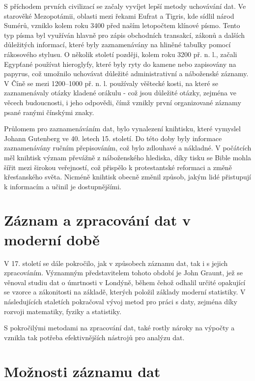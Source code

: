 S příchodem prvních civilizací se začaly vyvíjet lepší metody uchovávání dat. Ve starověké Mezopotámii, oblasti mezi řekami Eufrat a Tigris, kde sídlil národ 
Sumérů, vzniklo kolem roku 3400 před naším letopočtem klínové písmo. Tento typ písma byl využíván hlavně pro zápis obchodních transakcí, zákonů a dalších 
důležitých informací, které byly zaznamenávány na hliněné tabulky pomocí rákosového stylusu. O několik století později, kolem roku 3200 př. n. l., začali 
Egypťané používat hieroglyfy, které byly ryty do kamene nebo zapisovány na papyrus, což umožnilo uchovávat důležité administrativní a náboženské záznamy. 
V Číně se mezi 1200–1000 př. n. l. používaly věštecké kosti, na které se zaznamenávaly otázky kladené orákulu - což jsou důležité otázky, zejména ve věcech 
budoucnosti, i jeho odpovědi, čímž vznikly první organizované záznamy psané ranými čínskými znaky.

\newpage

Průlomem pro zaznamenáváním dat, bylo vynalezení knihtisku, které vymyslel Johann Gutenberg ve 40. letech 15. století. Do této doby byly informace 
zaznamenávány ručním přepisováním, což bylo zdlouhavé a nákladné. V počátcích měl knihtisk význam převážně z náboženského hlediska, díky tisku se Bible 
mohla šířit mezi širokou veřejností, což přispělo k protestantské reformaci a změně křesťanského světa. Nicméně knihtisk obecně změnil způsob, jakým lidé 
přistupují k informacím a učinil je dostupnějšími. \cite{knihtisk_medium}

\section{Záznam a zpracování dat v moderní době}
V 17. století se dále pokročilo, jak v způsobech záznamu dat, tak i s jejich zpracováním. Významným představitelem tohoto období je John Graunt, jež se věnoval 
studiu dat o úmrtnosti v Londýně, během čehož odhalil určité opakující se vzorce a zákonitosti na základě, kterých položil základy moderní statistiky. V 
následujících staletích pokračoval vývoj metod pro práci s daty, zejména díky rozvoji matematiky, fyziky a statistiky. \cite{britanicca_John_Graunt}

S pokročilými metodami na zpracování dat, také rostly nároky na výpočty a vznikla tak potřeba efektivnějších nástrojů pro analýzu dat.

\section{Možnosti záznamu dat}
\label{moznosti_zaznamu_dat}

